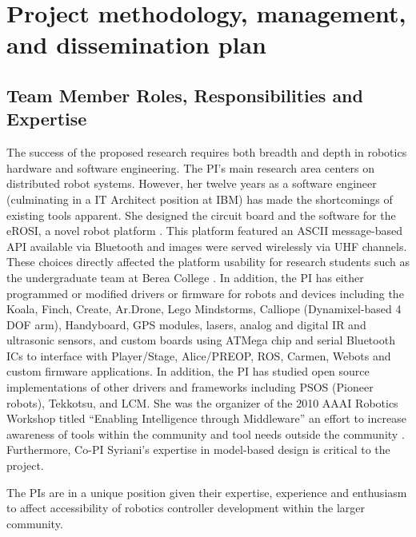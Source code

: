 
\section{Project methodology, management, and dissemination plan}
\subsection{Team Member Roles, Responsibilities and Expertise}

The success of the proposed research requires both breadth and depth in robotics hardware and software engineering.  The PI's main research area centers on distributed robot systems.  However, her twelve years as a software engineer (culminating in a IT Architect position at IBM) has made the shortcomings of existing tools apparent.  She designed the circuit board and the software for the eROSI, a novel robot platform \cite{walter2007design}.  This platform featured an ASCII message-based API available via Bluetooth and images were served wirelessly via UHF channels.  These choices directly affected the platform usability for research students such as the undergraduate team at Berea College \cite{Isaacs2006}.  In addition, the PI has either programmed or modified drivers or firmware for robots and devices including the Koala, Finch, Create, Ar.Drone, Lego Mindstorms, Calliope (Dynamixel-based 4 DOF arm), Handyboard, GPS modules, lasers, analog and digital IR and ultrasonic sensors, and custom boards using ATMega chip and serial Bluetooth ICs to interface with Player/Stage, Alice/PREOP, ROS, Carmen, Webots and custom firmware applications.  In addition, the PI has studied open source implementations of other drivers and frameworks including PSOS (Pioneer robots), Tekkotsu, and LCM.  She was the organizer of the 2010 AAAI Robotics Workshop titled ``Enabling Intelligence through Middleware'' an effort to increase awareness of tools within the community and tool needs outside the community \cite{MonicaAnderson2011}.
Furthermore, Co-PI Syriani's expertise in model-based design is critical to the project.

The PIs are in a unique position given their expertise, experience and enthusiasm to affect accessibility of robotics controller development within the larger community.



